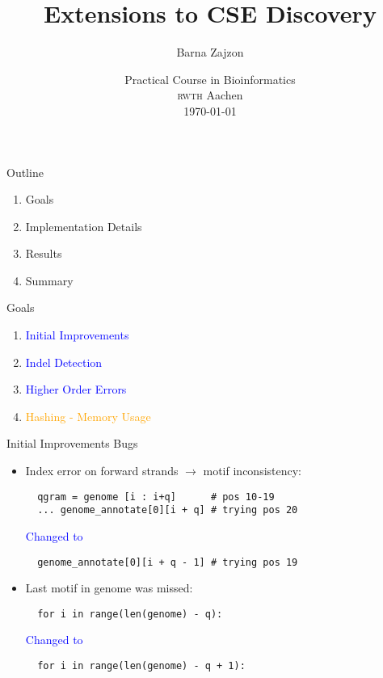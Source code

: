 \documentclass[nenglish]{beamer}
\title{Extensions to CSE Discovery}
\author{Barna Zajzon}
\date{Practical Course in Bioinformatics\\
  \textsc{rwth} Aachen\\[1ex] 
\today}
\begin{document}
 \begin{frame}{}
   \maketitle
 \end{frame}

\begin{frame}{Outline}
\begin{enumerate}
 \item Goals
 \item Implementation Details
 \item Results
 \item Summary
\end{enumerate}
\end{frame}

\begin{frame}{Goals}
\begin{enumerate}
 \item \textcolor{blue}{Initial Improvements}
 \item \textcolor{blue}{Indel Detection}
 \item \textcolor{blue}{Higher Order Errors}
 \item \textcolor{orange}{Hashing - Memory Usage}
\end{enumerate}
\end{frame}

\begin{frame}[fragile]{Initial Improvements}
{Bugs}
\begin{itemize}
  \itemsep0.5cm
 \item Index error on forward strands $\rightarrow$ motif inconsistency:

\begin{lstlisting}               
  qgram = genome [i : i+q]      # pos 10-19
  ... genome_annotate[0][i + q] # trying pos 20
 \end{lstlisting}
\textcolor{blue}{Changed to}
\begin{lstlisting}                 
  genome_annotate[0][i + q - 1] # trying pos 19
 \end{lstlisting}
\pause
  \item Last motif in genome was missed:
  \begin{lstlisting}                 
  for i in range(len(genome) - q):
 \end{lstlisting}
\textcolor{blue}{Changed to}
 \begin{lstlisting}                 
  for i in range(len(genome) - q + 1):
 \end{lstlisting}
\end{itemize}
\end{frame}
\end{document}
